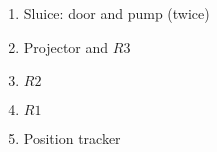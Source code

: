 
\begin{enumerate}
 \item Sluice: door and pump (twice)
 \item Projector and $R3$
 \item $R2$
 \item $R1$
 \item Position tracker
\end{enumerate}
